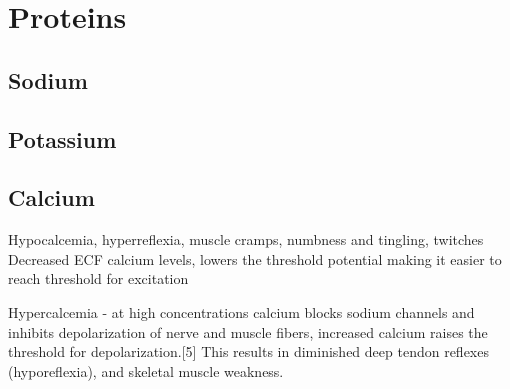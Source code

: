 \section{Proteins}



\subsection{Sodium}

\subsection{Potassium}

\subsection{Calcium}

Hypocalcemia, hyperreflexia, muscle cramps, numbness and tingling, twitches
Decreased ECF calcium levels, lowers the threshold potential making it easier to reach threshold for excitation

Hypercalcemia - at high concentrations calcium blocks sodium channels and inhibits depolarization of nerve and muscle fibers, increased calcium raises the threshold for depolarization.[5] This results in diminished deep tendon reflexes (hyporeflexia), and skeletal muscle weakness.

\printbibliography[heading=subbibintoc]
